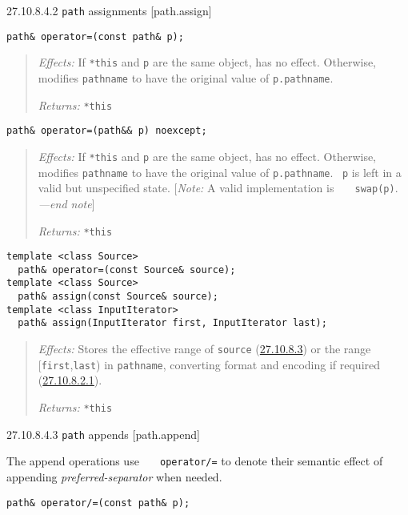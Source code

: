 27.10.8.4.2 \texttt{path} assignments {[}path.assign{]}

\begin{verbatim}
path& operator=(const path& p);
\end{verbatim}

\begin{quote}
\emph{Effects:} If \texttt{*this} and \texttt{p} are the same object,
has no effect. Otherwise, modifies \texttt{pathname} to have the
original value of \texttt{p.pathname}.

\emph{Returns:} \texttt{*this}
\end{quote}

\begin{verbatim}
path& operator=(path&& p) noexcept;
\end{verbatim}

\begin{quote}
\emph{Effects:} If \texttt{*this} and \texttt{p} are the same object,
has no effect. Otherwise, modifies \texttt{pathname} to have the
original value of \texttt{p.pathname}.~ \texttt{p} is left in a valid
but unspecified state. {[}\emph{Note:} A valid implementation is
\texttt{\ \ \ swap(p)}. \emph{---end note}{]}

\emph{Returns:} \texttt{*this}
\end{quote}

\begin{verbatim}
template <class Source>
  path& operator=(const Source& source);
template <class Source>
  path& assign(const Source& source);
template <class InputIterator>
  path& assign(InputIterator first, InputIterator last);
\end{verbatim}

\begin{quote}
\emph{Effects:} Stores the effective range of \texttt{source}
(\hyperref[path.req]{27.10.8.3}) or the range
{[}\texttt{first},\texttt{last}) in \texttt{pathname}, converting format
and encoding if required (\hyperref[path.arg.convert]{27.10.8.2.1}).

\emph{Returns:} \texttt{*this}
\end{quote}

27.10.8.4.3 \texttt{path} appends {[}path.append{]}

The append operations use \texttt{\ \ \ operator/=} to denote their
semantic effect of appending \emph{preferred-separator} when needed.

\begin{verbatim}
path& operator/=(const path& p);
\end{verbatim}

